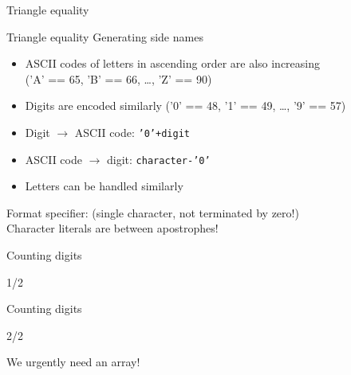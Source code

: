 \documentclass[usenames,dvipsnames,aspectratio=169]{beamer}
\begin{document}
\begin{frame}{Triangle equality}
    \begin{exampleblock}{}
    \tiny
    \vspace{-.3cm}
    
    \vspace{-.3cm}
  \end{exampleblock}
\end{frame}

\begin{frame}[fragile]{Triangle equality}
  Generating side names
  \begin{itemize}
    \item ASCII codes of letters in ascending order are also increasing \\ ('A' == 65, 'B' == 66, 
\dots, 'Z' == 90)
    \item Digits are encoded similarly ('0' == 48, '1' == 49, \dots, '9' == 57)
    \item Digit $\rightarrow$ ASCII code: \texttt{'0'+digit}
    \item ASCII code $\rightarrow$ digit: \texttt{character-'0'}
    \item Letters can be handled similarly
  \end{itemize}
  \begin{exampleblock}{}
    \tiny
    
  \end{exampleblock}
  Format specifier:  (single character, not terminated by zero!)\\
  Character literals are between apostrophes!
\end{frame}

\begin{frame}{Counting digits}
    \begin{exampleblock}{ 1/2}
    \tiny
    
  \end{exampleblock}
\end{frame}

\begin{frame}{Counting digits}
    \begin{exampleblock}{ 2/2}
    \scriptsize
    
  \end{exampleblock}
  \vfill
  We urgently need an array!
\end{frame}
\end{document}
